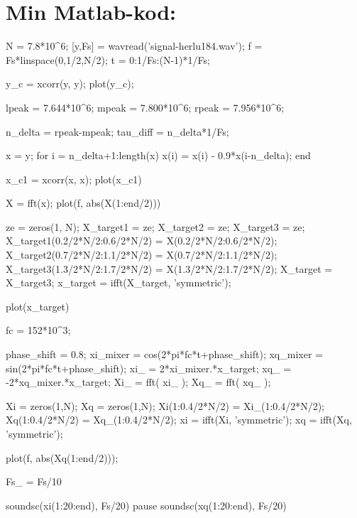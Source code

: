 \documentclass[10pt,twocolumn]{article}
\begin{document}
\clearpage

\section*{Min Matlab-kod:}
\begin{spverbatim}
N = 7.8*10^6;
[y,Fs] = wavread('signal-herlu184.wav');
f = Fs*linspace(0,1/2,N/2);
t = 0:1/Fs:(N-1)*1/Fs;

% 
y_c = xcorr(y, y);
plot(y_c);

lpeak = 7.644*10^6;
mpeak = 7.800*10^6;
rpeak = 7.956*10^6;

n_delta = rpeak-mpeak;
tau_diff = n_delta*1/Fs;

%
x = y;
for i = n_delta+1:length(x)
    x(i) = x(i) - 0.9*x(i-n_delta);
end

x_c1 = xcorr(x, x);
plot(x_c1)

X = fft(x);
plot(f, abs(X(1:end/2)))

ze = zeros(1, N);
X_target1 = ze;
X_target2 = ze;
X_target3 = ze;
X_target1(0.2/2*N/2:0.6/2*N/2) = X(0.2/2*N/2:0.6/2*N/2);
X_target2(0.7/2*N/2:1.1/2*N/2) = X(0.7/2*N/2:1.1/2*N/2);
X_target3(1.3/2*N/2:1.7/2*N/2) = X(1.3/2*N/2:1.7/2*N/2);
X_target = X_target3;
x_target = ifft(X_target, 'symmetric');

plot(x_target)

fc = 152*10^3;

%
%
phase_shift = 0.8;
xi_mixer = cos(2*pi*fc*t+phase_shift);
xq_mixer = sin(2*pi*fc*t+phase_shift);
xi_ = 2*xi_mixer.*x_target;
xq_ = -2*xq_mixer.*x_target;
Xi_ = fft( xi_ );
Xq_ = fft( xq_ );

Xi = zeros(1,N);
Xq = zeros(1,N);
Xi(1:0.4/2*N/2) = Xi_(1:0.4/2*N/2);
Xq(1:0.4/2*N/2) = Xq_(1:0.4/2*N/2);
xi = ifft(Xi, 'symmetric');
xq = ifft(Xq, 'symmetric');

plot(f, abs(Xq(1:end/2)));

Fs_ = Fs/10

soundsc(xi(1:20:end), Fs/20)
pause
soundsc(xq(1:20:end), Fs/20)  

\end{spverbatim}
\end{document}
